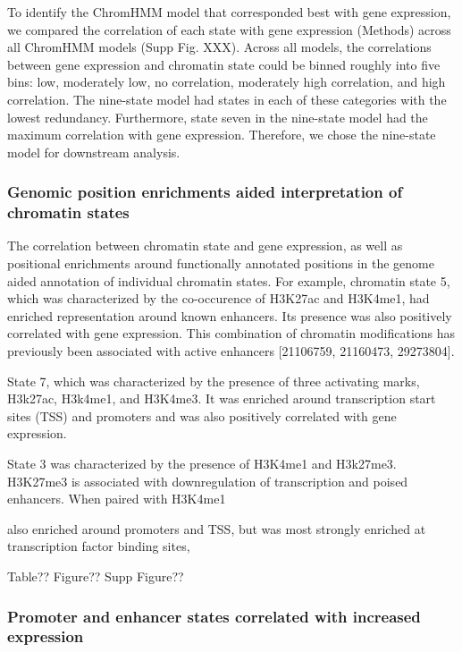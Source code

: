 \documentclass[10pt,letterpaper]{article}
\begin{document}
To identify the ChromHMM model that corresponded best with gene
expression, we compared the correlation of each state with gene
expression (Methods) across all ChromHMM models (Supp Fig. XXX). Across
all models, the correlations between gene expression and chromatin state
could be binned roughly into five bins: low, moderately low, no
correlation, moderately high correlation, and high correlation. The
nine-state model had states in each of these categories with the lowest
redundancy. Furthermore, state seven in the nine-state model had the
maximum correlation with gene expression. Therefore, we chose the
nine-state model for downstream analysis.

\hypertarget{genomic-position-enrichments-aided-interpretation-of-chromatin-states}{%
\subsubsection{Genomic position enrichments aided interpretation of
chromatin
states}\label{genomic-position-enrichments-aided-interpretation-of-chromatin-states}}

The correlation between chromatin state and gene expression, as well as
positional enrichments around functionally annotated positions in the
genome aided annotation of individual chromatin states. For example,
chromatin state 5, which was characterized by the co-occurence of
H3K27ac and H3K4me1, had enriched representation around known enhancers.
Its presence was also positively correlated with gene expression. This
combination of chromatin modifications has previously been associated
with active enhancers {[}21106759, 21160473, 29273804{]}.

State 7, which was characterized by the presence of three activating
marks, H3k27ac, H3k4me1, and H3K4me3. It was enriched around
transcription start sites (TSS) and promoters and was also positively
correlated with gene expression.

State 3 was characterized by the presence of H3K4me1 and H3k27me3.
H3K27me3 is associated with downregulation of transcription and poised
enhancers. When paired with H3K4me1

also enriched around promoters and TSS, but was most strongly enriched
at transcription factor binding sites,

Table?? Figure?? Supp Figure??

\hypertarget{promoter-and-enhancer-states-correlated-with-increased-expression}{%
\subsubsection{Promoter and enhancer states correlated with increased
expression}\label{promoter-and-enhancer-states-correlated-with-increased-expression}}
\end{document}
